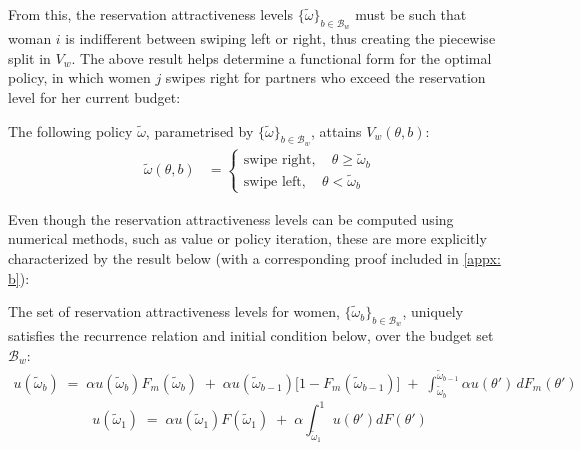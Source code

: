From this, the reservation attractiveness levels $\{\widetilde\omega\}_{b\in \mathcal{B}_w}$ must be such that woman $i$ is indifferent between swiping left or right, thus creating the piecewise split in $V_w$. The above result helps determine a functional form for the optimal policy, in which women $j$ swipes right for partners who exceed the reservation level for her current budget: 

\begin{corollary}\label{cor:optpolicy}
    The following policy $\widetilde\omega$, parametrised by $\{\widetilde\omega\}_{b\in \mathcal{B}_w}$, attains $V_w(\theta,b)$:
    \begin{equation*}
        \begin{split}
            \widetilde\omega(\theta,b)&=\begin{cases}
                \text{swipe right},\quad \theta\geq \widetilde{\omega}_b \\ 
                \text{swipe left}, \quad\theta< \widetilde\omega _b  
            \end{cases}   
        \end{split}
    \end{equation*} 
\end{corollary}


Even though the reservation attractiveness levels can be computed using numerical methods, such as value or policy iteration, these are more explicitly characterized by the result below (with a corresponding proof included in \autoref{appx: b}): 

\begin{proposition}\label{prop:recurrence relation}
The set of reservation attractiveness levels for women, $\{\widetilde\omega_b\}_{b\in \mathcal{B}_w}$, uniquely satisfies the recurrence relation and initial condition below, over the budget set $\mathcal{B}_w$: 
\begin{equation}\label{eq:recurrence relation}
    \begin{aligned}
        u(\widetilde \omega_b) \;=\; \alpha u(\widetilde \omega_b) F_m(\widetilde \omega_b) \;+\; \alpha u(\widetilde \omega_{b-1}) \Big[1- F_m(\widetilde \omega_{b-1})\Big] \;+\; \int^{\widetilde \omega_{b-1}}_{\widetilde \omega_b} \alpha u(\theta')\,dF_m(\theta')
    \end{aligned} 
\end{equation}  
\begin{equation}\label{eq:initial condition}
    u(\widetilde\omega_1) \;=\; \alpha u(\widetilde\omega_1)F(\widetilde\omega_1) \;+\; \alpha \int^1_{\widetilde\omega_1}u(\theta')dF(\theta')
\end{equation}
\end{proposition} 

